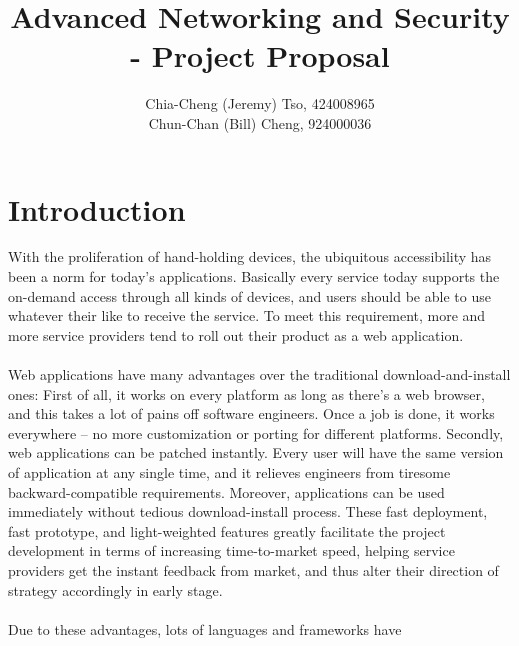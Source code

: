 \documentclass[12pt, a4paper]{article}
\title{
    Advanced Networking and Security\\
    - Project Proposal
    \vspace{-2ex}
}
\author{
    \normalfont \normalsize 
    Chia-Cheng (Jeremy) Tso, 
    424008965\\
    \normalfont \normalsize 
    Chun-Chan (Bill) Cheng, 
    924000036
}
\date{
    \normalfont \normalsize 
    \vspace{-5ex}
}
\begin{document}
\maketitle
%

\section{Introduction}
With the proliferation of hand-holding devices,
the ubiquitous accessibility has been a norm for today's applications.
Basically every service today supports the on-demand access through all kinds of devices,
and users should be able to use whatever their like to receive the service.
To meet this requirement, more and more service providers tend to roll
out their product as a
web application.
\\\\
Web applications have many advantages over the traditional download-and-install ones:
First of all, it works on every platform as long as there's a web browser, and
this takes a lot of pains off software engineers. Once a job is done, it works everywhere
-- no more customization or porting for different platforms.
Secondly, web applications can be patched instantly.
Every user will have the same version of application at any single time,
and it relieves engineers from
tiresome backward-compatible requirements.
Moreover,
applications can be used immediately without tedious download-install process.
These fast deployment, fast prototype, and light-weighted features
greatly facilitate the project development in terms of
increasing time-to-market speed,
helping service providers get the instant
feedback from market, and thus alter their direction of strategy accordingly in early stage.
\\\\
Due to these advantages, lots of languages and frameworks have
\end{document}
